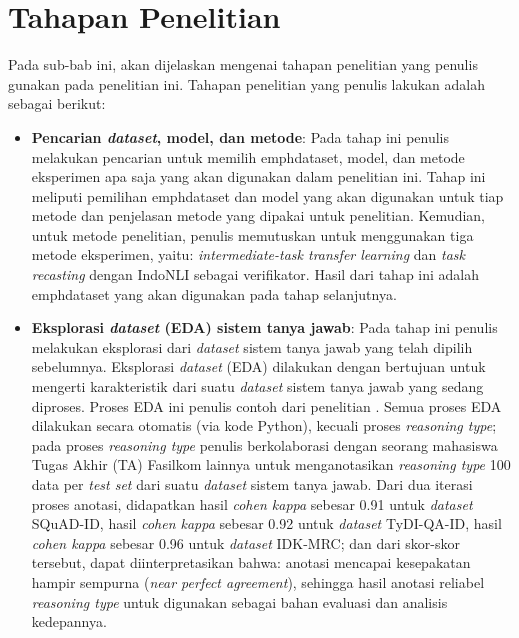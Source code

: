 \section{Tahapan Penelitian}
\label{3.2}
Pada sub-bab ini, akan dijelaskan mengenai tahapan penelitian yang penulis gunakan pada penelitian ini. Tahapan penelitian yang penulis lakukan adalah sebagai berikut:

\begin{itemize}
    
    \item \textbf{Pencarian \emph{dataset}, model, dan metode}: Pada tahap ini penulis melakukan pencarian untuk memilih emph{dataset}, model, dan metode eksperimen apa saja yang akan digunakan dalam penelitian ini. Tahap ini meliputi pemilihan emph{dataset} dan model yang akan digunakan untuk tiap metode dan penjelasan metode yang dipakai untuk penelitian. Kemudian, untuk metode penelitian, penulis memutuskan untuk menggunakan tiga metode eksperimen, yaitu: \emph{intermediate-task transfer learning} dan \emph{task recasting} dengan IndoNLI sebagai verifikator. Hasil dari tahap ini adalah emph{dataset} yang akan digunakan pada tahap selanjutnya.

    \item \textbf{Eksplorasi \emph{dataset} (EDA) sistem tanya jawab}: Pada tahap ini penulis melakukan eksplorasi dari \emph{dataset} sistem tanya jawab yang telah dipilih sebelumnya. Eksplorasi \emph{dataset} (EDA) dilakukan dengan bertujuan untuk mengerti karakteristik dari suatu \emph{dataset} sistem tanya jawab yang sedang diproses. Proses EDA ini penulis contoh dari penelitian \citep{nguyen-etal-2020-vietnamese, rajpurkar-etal-2016-squad}. Semua proses EDA dilakukan secara otomatis (via kode Python), kecuali proses \emph{reasoning type}; pada proses \emph{reasoning type} penulis berkolaborasi dengan seorang mahasiswa Tugas Akhir (TA) Fasilkom lainnya untuk menganotasikan \emph{reasoning type} 100 data per \emph{test set} dari suatu \emph{dataset} sistem tanya jawab. Dari dua iterasi proses anotasi, didapatkan hasil \emph{cohen kappa} sebesar 0.91 untuk \emph{dataset} SQuAD-ID, hasil \emph{cohen kappa} sebesar 0.92 untuk \emph{dataset} TyDI-QA-ID, hasil \emph{cohen kappa} sebesar 0.96 untuk \emph{dataset} IDK-MRC; dan dari skor-skor tersebut, dapat diinterpretasikan bahwa: anotasi mencapai kesepakatan hampir sempurna (\emph{near perfect agreement}), sehingga hasil anotasi reliabel \emph{reasoning type} untuk digunakan sebagai bahan evaluasi dan analisis kedepannya. 


\end{itemize}
